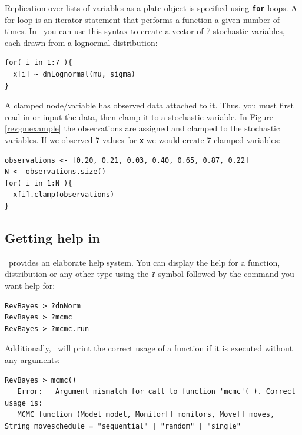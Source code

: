 \documentclass[11pt]{article}
\newcommand{\cl}[1]{{\texttt{\textbf{#1}}}}
\begin{document}
Replication over lists of variables as a plate object is specified using \cl{for} loops. 
A for-loop is an iterator statement that performs a function a given number of times. 
In \Rev~you can use this syntax to create a vector of 7 stochastic variables, each drawn from a lognormal distribution:
{\tt \begin{snugshade*}
\begin{lstlisting}
for( i in 1:7 ){
  x[i] ~ dnLognormal(mu, sigma)
}
\end{lstlisting}
\end{snugshade*}}

A clamped node/variable has observed data attached to it. 
Thus, you must first read in or input the data, then clamp it to a stochastic variable. 
In Figure \ref{revgmexample} the observations are assigned and clamped to the stochastic variables.
If we observed 7 values for \cl{x} we would create 7 clamped variables:
{\tt \begin{snugshade*}
\begin{lstlisting}
observations <- [0.20, 0.21, 0.03, 0.40, 0.65, 0.87, 0.22]
N <- observations.size()
for( i in 1:N ){
  x[i].clamp(observations)
}
\end{lstlisting}
\end{snugshade*}}



\subsection*{Getting help in \RevBayes}

\RevBayes~provides an elaborate help system. 
You can display the help for a function, distribution or any other type using the \cl{?} symbol followed by the command you want help for:
{\tt \begin{snugshade*}
\begin{lstlisting}
RevBayes > ?dnNorm
RevBayes > ?mcmc
RevBayes > ?mcmc.run
\end{lstlisting}
\end{snugshade*}}

Additionally, \RevBayes~will print the correct usage of a function if it is executed without any arguments:
{\tt \small \begin{snugshade*}
\begin{lstlisting}
RevBayes > mcmc()
   Error:   Argument mismatch for call to function 'mcmc'( ). Correct usage is:
   MCMC function (Model model, Monitor[] monitors, Move[] moves, String moveschedule = "sequential" | "random" | "single"
\end{lstlisting}
\end{snugshade*}}
\end{document}
